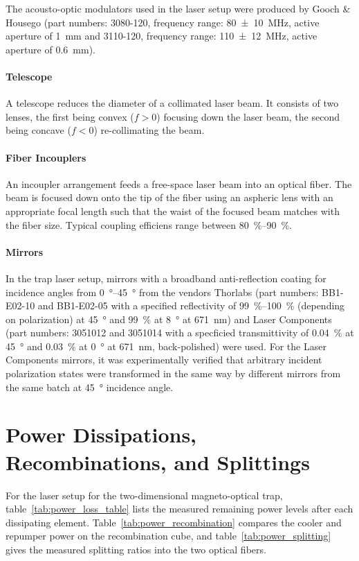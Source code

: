The acousto-optic modulators used in the laser setup were produced by Gooch \& Housego (part numbers: 3080-120, frequency range: \SI{80(10)}{\mega\hertz}, active aperture of \SI{1}{\milli\meter} and 3110-120, frequency range: \SI{110(12)}{\mega\hertz}, active aperture of \SI{0.6}{\milli\meter}).

\paragraph{Telescope} A telescope reduces the diameter of a collimated laser beam. It consists of two lenses, the first being convex ($f > 0$) focusing down the laser beam, the second being concave ($f < 0$) re-collimating the beam.
    
\paragraph{Fiber Incouplers} An incoupler arrangement feeds a free-space laser beam into an optical fiber. The beam is focused down onto the tip of the fiber using an aspheric lens with an appropriate focal length such that the waist of the focused beam matches with the fiber size. Typical coupling efficiens range between \SIrange[]{80}{90}{\percent}.
    
\paragraph{Mirrors}
In the trap laser setup, mirrors with a broadband anti-reflection coating for incidence angles from \SIrange[]{0}{45}{\degree} from the vendors Thorlabs (part numbers: BB1-E02-10 and BB1-E02-05 with a specified reflectivity of \SIrange[]{99}{100}{\percent} (depending on polarization) at \SI[]{45}{\degree} and \SI[]{99}{\percent} at \SI[]{8}{\degree} at \SI[]{671}{\nano\meter}) and Laser Components (part numbers: 3051012 and 3051014 with a specficied transmittivity of \SI[]{0.04}{\percent} at \SI[]{45}{\degree} and \SI[]{0.03}{\percent} at \SI[]{0}{\degree} at \SI[]{671}{\nano\meter}, back-polished) were used. For the Laser Components mirrors, it was experimentally verified that arbitrary incident polarization states were transformed in the same way by different mirrors from the same batch at \SI[]{45}{\degree} incidence angle.

\section{Power Dissipations, Recombinations, and Splittings}\label{ch:power_losses}
For the laser setup for the two-dimensional magneto-optical trap, table~\ref{tab:power_loss_table} lists the measured remaining power levels after each dissipating element. Table~\ref{tab:power_recombination} compares the cooler and repumper power on the recombination cube, and table~\ref{tab:power_splitting} gives the measured splitting ratios into the two optical fibers.

